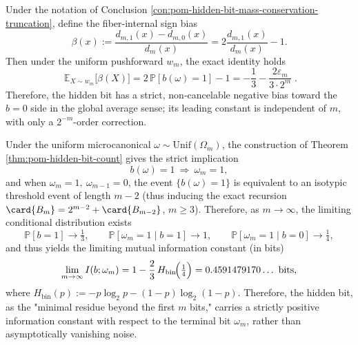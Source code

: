 \begin{conclusion}\label{con:pom-hidden-bit-global-sign-bias}
Under the notation of Conclusion \ref{con:pom-hidden-bit-mass-conservation-truncation}, define the fiber-internal sign bias
\[
\beta(x):=\frac{d_{m,1}(x)-d_{m,0}(x)}{d_m(x)}
=2\frac{d_{m,1}(x)}{d_m(x)}-1.
\]
Then under the uniform pushforward \(w_m\), the exact identity holds
\[
\boxed{\;
\mathbb E_{X\sim w_m}\bigl[\beta(X)\bigr]
=2\,\mathbb P[b(\omega)=1]-1
=-\frac13-\frac{2\varepsilon_m}{3\cdot 2^m}\; }.
\]
Therefore, the hidden bit has a strict, non-cancelable negative bias toward the \(b=0\) side in the global average sense; its leading constant is independent of \(m\), with only a \(2^{-m}\)-order correction.
\end{conclusion}

\begin{conclusion}\label{con:pom-hidden-bit-topbit-mutual-information}
Under the uniform microcanonical \(\omega\sim\mathrm{Unif}(\Omega_m)\), the construction of Theorem \ref{thm:pom-hidden-bit-count} gives the strict implication
\[
b(\omega)=1\ \Longrightarrow\ \omega_m=1,
\]
and when \(\omega_m=1,\ \omega_{m-1}=0\), the event \(\{b(\omega)=1\}\) is equivalent to an isotypic threshold event of length \(m-2\) (thus inducing the exact recursion \(\card{B_m}=2^{m-2}+\card{B_{m-2}}\), \(m\ge 3\)).
Therefore, as \(m\to\infty\), the limiting conditional distribution exists
\[
\mathbb P[b=1]\to\tfrac13,\qquad
\mathbb P[\omega_m=1\mid b=1]\to 1,\qquad
\mathbb P[\omega_m=1\mid b=0]\to\tfrac14,
\]
and thus yields the limiting mutual information constant (in bits)
\[
\lim_{m\to\infty}I(b;\omega_m)
=1-\frac{2}{3}\,H_{\mathrm{bin}}\!\Bigl(\tfrac14\Bigr)
=0.4591479170\ldots\ \mathrm{bits},
\]
where \(H_{\mathrm{bin}}(p):=-p\log_2 p-(1-p)\log_2(1-p)\).
Therefore, the hidden bit, as the "minimal residue beyond the first \(m\) bits," carries a strictly positive information constant with respect to the terminal bit \(\omega_m\), rather than asymptotically vanishing noise.
\end{conclusion}

